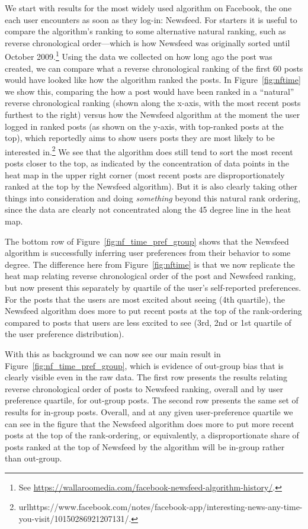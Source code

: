 \documentclass[12pt,letterpaper]{article}
\begin{document}
We start with results for the most widely used algorithm on Facebook, the one each user encounters as soon as they log-in: Newsfeed. For starters it is useful to compare the algorithm's ranking to some alternative natural ranking, such as reverse chronological order---which is how Newsfeed was originally sorted until October 2009.\footnote{See \url{https://wallaroomedia.com/facebook-newsfeed-algorithm-history/}.} Using the data we collected on how long ago the post was created, we can compare what a reverse chronological ranking of the first 60 posts would have looked like how the algorithm ranked the posts. In Figure~\ref{fig:nftime} we show this, comparing the how a post would have been ranked in a ``natural'' reverse chronological ranking (shown along the x-axis, with the most recent posts furthest to the right) versus how the Newsfeed algorithm at the moment the user logged in ranked posts (as shown on the y-axis, with top-ranked posts at the top), which reportedly aims to show users posts they are most likely to be interested in.\footnote{url{https://www.facebook.com/notes/facebook-app/interesting-news-any-time-you-visit/10150286921207131/}.} We see that the algorithm does still tend to sort the most recent posts closer to the top, as indicated by the concentration of data points in the heat map in the upper right corner (most recent posts are disproportionately ranked at the top by the Newsfeed algorithm). But it is also clearly taking other things into consideration and doing \emph{something} beyond this natural rank ordering, since the data are clearly not concentrated along the 45 degree line in the heat map.




The bottom row of Figure~\ref{fig:nf_time_pref_group} shows that the Newsfeed algorithm is successfully inferring user preferences from their behavior to some degree. The difference here from Figure~\ref{fig:nftime} is that we now replicate the heat map relating reverse chronological order of the post and Newsfeed ranking, but now present this separately by quartile of the user's self-reported preferences.  For the posts that the users are most excited about seeing (4th quartile), the Newsfeed algorithm does more to put recent posts at the top of the rank-ordering compared to posts that users are less excited to see (3rd, 2nd or 1st quartile of the user preference distribution).



With this as background we can now see our main result in Figure~\ref{fig:nf_time_pref_group}, which is evidence of out-group bias that is clearly visible even in the raw data. The first row presents the results relating reverse chronological order of posts to Newsfeed ranking, overall and by user preference quartile, for out-group posts. The second row presents the same set of results for in-group posts. Overall, and at any given user-preference quartile we can see in the figure that the Newsfeed algorithm does more to put more recent posts at the top of the rank-ordering, or equivalently, a disproportionate share of posts ranked at the top of Newsfeed by the algorithm will be in-group rather than out-group.
\end{document}
